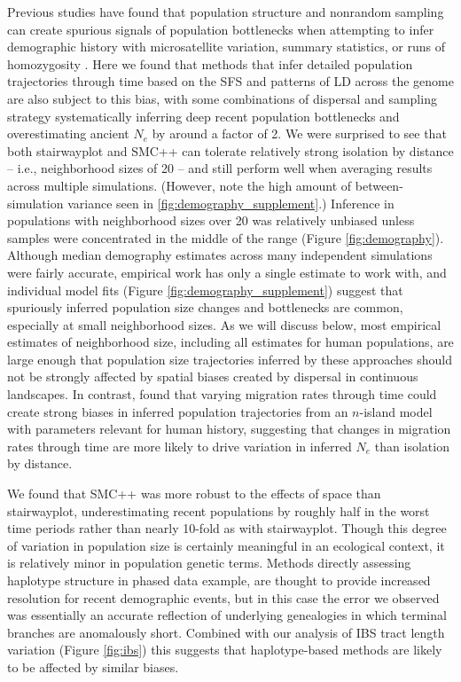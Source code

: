 \documentclass[10pt,twoside,lineno,hidelinks]{preprint}
\begin{document}
Previous studies have found that population structure and nonrandom sampling can create spurious signals of population bottlenecks when attempting to infer demographic history with microsatellite variation, summary statistics, or runs of homozygosity \citep{Chikhi2010,Stadler2009,Ptak2002,Mazet2015,leblois2006genetics}. Here we found that methods that infer detailed population trajectories through time based on the SFS and patterns of LD across the genome are also subject to this bias, with some combinations of dispersal and sampling strategy systematically inferring deep recent population bottlenecks and overestimating ancient $N_{e}$ by around a factor of 2. We were surprised to see that both stairwayplot and SMC++ can tolerate relatively strong isolation by distance -- i.e., neighborhood sizes of 20 -- and still perform well when averaging results across multiple simulations.
(However, note the high amount of between-simulation variance seen in \autoref{fig:demography_supplement}.) 
Inference in populations with neighborhood sizes over 20 was relatively unbiased unless samples were concentrated in the middle of the range (Figure \ref{fig:demography}). 
Although median demography estimates across many independent simulations were fairly accurate,
empirical work has only a single estimate to work with,
and individual model fits (Figure \ref{fig:demography_supplement})
suggest that spuriously inferred population size changes and bottlenecks are common, especially at small neighborhood sizes. 
As we will discuss below, most empirical estimates of neighborhood size, including all estimates for human populations, are large enough that population size trajectories inferred by these approaches should not be strongly affected by spatial biases created by dispersal in continuous landscapes. In contrast, \citet{Mazet2015} found that varying migration rates through time could create strong biases in inferred population trajectories from an $n$-island model with parameters relevant for human history, suggesting that changes in migration rates through time are more likely to drive variation in inferred $N_{e}$ than isolation by distance. 

We found that SMC++ was more robust to the effects of space than stairwayplot, underestimating recent populations by roughly half in the worst time periods rather than nearly 10-fold as with stairwayplot. Though this degree of variation in population size is certainly meaningful in an ecological context, it is relatively minor in population genetic terms. 
Methods directly assessing haplotype structure in phased data example, \citep[e.g.,][]{browning2015accurate} are thought to provide increased resolution for recent demographic events,
but in this case the error we observed was essentially an accurate reflection of underlying genealogies in which terminal branches are anomalously short. Combined with our analysis of IBS tract length variation (Figure \ref{fig:ibs}) this suggests that haplotype-based methods are likely to be affected by similar biases. 
\end{document}
